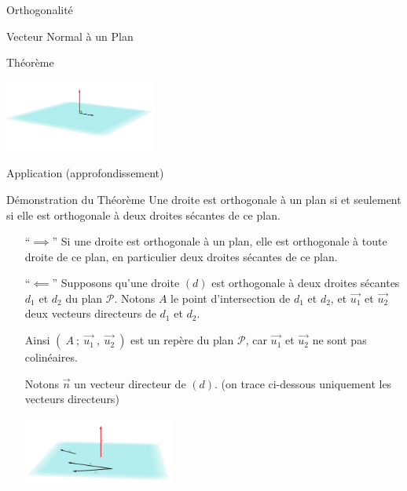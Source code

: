 \documentclass{coursbook}
\begin{document}
\begin{Gpartie}{Orthogonalité}
\begin{Spartie}{Vecteur Normal à un Plan}
\begin{SSpartie}{Théorème}
                \begin{center}
                    \includegraphics[width=5cm]{rsc/12fig5.png}
                    \parbox{\linewidth}{}
                \end{center}
            \end{SSpartie}
        \end{Spartie}
        \begin{Spartie}{Application (approfondissement)} 
            \begin{SSpartie}{Démonstration du Théorème} 
                \og Une droite est orthogonale à un plan si et seulement si elle est orthogonale à deux droites sécantes de ce plan. \fg
                \begin{itemize}[leftmargin=7ex]
                    \item[``$\implies$''] Si une droite est orthogonale à un plan, elle est orthogonale à toute droite de ce plan, en particulier deux droites sécantes de ce plan.
                    \item[``$\impliedby$''] Supposons qu'une droite $(d)$ est orthogonale à deux droites sécantes $d_1$ et $d_2$ du plan $\mathcal{P}$. Notons $A$ le point d'intersection de $d_1$ et $d_2$, et $\vec{u_1}$ et $\vec{u_2}$ deux vecteurs directeurs de $d_1$ et $d_2$.

                    Ainsi $\left(~A~;~\vec{u_1}~,~\vec{u_2}~\right)$ est un repère du plan $\mathcal{P}$, car $\vec{u_1}$ et $\vec{u_2}$ ne sont pas colinéaires.

                    Notons $\vec{n}$ un vecteur directeur de $(d)$. (on trace ci-dessous uniquement les vecteurs directeurs)
                    \vspace{-0.2ex}
                    \begin{center}
                        \includegraphics[width=5cm]{rsc/12fig6.png}
                        \parbox{\linewidth}{}
                    \end{center}
    

\end{itemize}
\end{SSpartie}
\end{Spartie}
\end{Gpartie}
\end{document}
